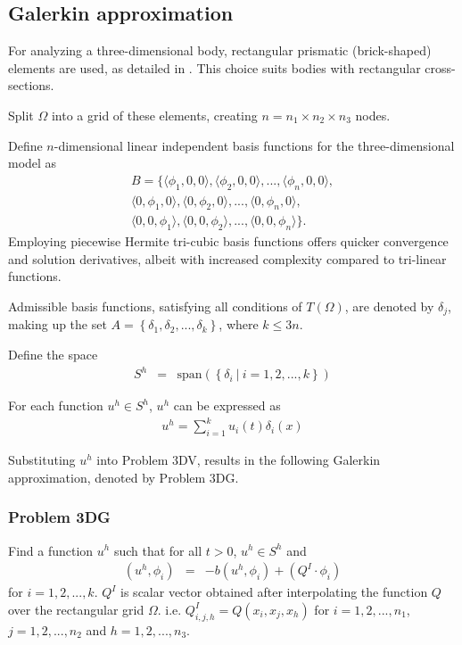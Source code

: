 \subsection*{Galerkin approximation}
For analyzing a three-dimensional body, rectangular prismatic (brick-shaped) elements are used, as detailed in \cite{Wu06}. This choice suits bodies with rectangular cross-sections.

Split $\Omega$ into a grid of these elements, creating $n = n_1 \times n_2 \times n_3$ nodes.

Define $n$-dimensional linear independent basis functions for the three-dimensional model as
\begin{eqnarray*}
 B = \{\langle\phi_1, 0 , 0\rangle, \langle\phi_2, 0, 0\rangle,...,\langle\phi_{n}, 0, 0 \rangle,\\
	\langle 0,\phi_1 ,0 \rangle,\langle 0 ,\phi_2,0\rangle,...,\langle 0,\phi_{n},0\rangle,\\
	\langle 0,0,\phi_1 \rangle,\langle 0,0,\phi_2\rangle,...,\langle 0,0,\phi_{n}\rangle \}.
\end{eqnarray*}
Employing piecewise Hermite tri-cubic basis functions offers quicker convergence and solution derivatives, albeit with increased complexity compared to tri-linear functions.

Admissible basis functions, satisfying all conditions of $T(\Omega)$, are denoted by $\delta_j$, making up the set $A = \left\{\delta_1, \delta_2,... , \delta_k\right\}$, where $k \leq 3n$.


Define the space
\begin{eqnarray*}
	S^h & = & \textrm{span}\left(\left\{\delta_i \ | \ i = 1,2,...,k \right\} \right)
\end{eqnarray*}

For each function $u^h \in S^h$, $u^h$ can be expressed as
\begin{eqnarray*}
	u^h = \sum_{i = 1}^{k} u_i(t) \delta_{i}(x)
\end{eqnarray*}

Substituting $u^h$ into Problem 3DV, results in the following Galerkin approximation, denoted by Problem 3DG.

\subsubsection*{Problem 3DG}
Find a function $u^h$ such that for all $t>0$, $u^h \in S^h$ and
\begin{eqnarray*}
	(u^h, \phi_i) & = & -b(u^h,\phi_i) + (Q^I \cdot \phi_i)
\end{eqnarray*} for $i = 1,2,...,k$. $Q^I$ is scalar vector obtained after interpolating the function $Q$ over the rectangular grid $\Omega$. i.e. $Q^I_{i,j, h} = Q(x_i,x_j, x_h)$ for $i = 1,2,...,n_1$, $j = 1,2,...,n_2$ and $h = 1,2,...,n_3$.


